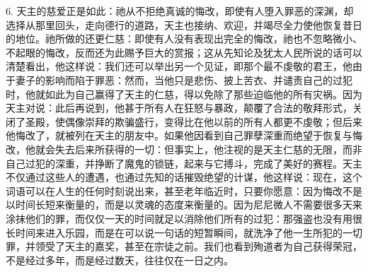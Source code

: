 6. 天主的慈爱正是如此：祂从不拒绝真诚的悔改，即使有人堕入罪恶的深渊，却选择从那里回头，走向德行的道路，天主也接纳、欢迎，并竭尽全力使他恢复昔日的地位。祂所做的还更仁慈：即使有人没有表现出完全的悔改，祂也不忽略微小、不起眼的悔改，反而还为此赐予巨大的赏报；这从先知论及犹太人民所说的话可以清楚看出，他这样说：我们还可以举出另一个见证，即那个最不虔敬的君王，他由于妻子的影响而陷于罪恶：然而，当他只是悲伤、披上苦衣、并谴责自己的过犯时，他就如此为自己赢得了天主的仁慈，得以免除了那些迫临他的所有灾祸。因为天主对说：此后再说到，他甚于所有人在狂怒与暴政，颠覆了合法的敬拜形式，关闭了圣殿，使偶像崇拜的欺骗盛行，变得比在他以前的所有人都更不虔敬；但后来他悔改了，就被列在天主的朋友中。如果他因看到自己罪孽深重而绝望于恢复与悔改，他就会失去后来所获得的一切：但事实上，他注视的是天主仁慈的无限，而非自己过犯的深重，并挣断了魔鬼的锁链，起来与它搏斗，完成了美好的赛程。天主不仅通过这些人的遭遇，也通过先知的话摧毁绝望的计谋，他这样说：现在，这个词语可以在人生的任何时刻说出来，甚至老年临近时，只要你愿意：因为悔改不是以时间长短来衡量的，而是以灵魂的态度来衡量的。因为尼尼微人不需要很多天来涂抹他们的罪，而仅仅一天的时间就足以消除他们所有的过犯：那强盗也没有用很长时间来进入乐园，而是在可以说一句话的短暂瞬间，就洗净了他一生所犯的一切罪，并领受了天主的嘉奖，甚至在宗徒之前。我们也看到殉道者为自己获得荣冠，不是经过多年，而是经过数天，往往仅在一日之内。\par

